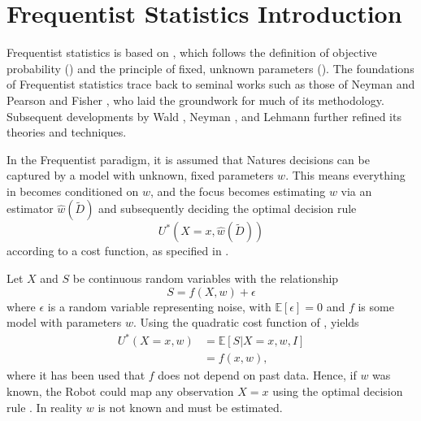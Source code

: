 \chapter{Frequentist Statistics Introduction}
\label{chp:freq}
Frequentist statistics is based on , which follows the definition of objective probability () and the principle of fixed, unknown parameters (). The foundations of Frequentist statistics trace back to seminal works such as those of Neyman and Pearson \citep{Neyman1928OnSR} and Fisher \citep{fisher1925statistical}, who laid the groundwork for much of its methodology. Subsequent developments by Wald \citep{Wald1945Sequential}, Neyman \citep{Neyman1948Consistent}, and Lehmann \citep{lehmann1986testing} further refined its theories and techniques.\newline

In the Frequentist paradigm, it is assumed that Natures decisions can be captured by a model with unknown, fixed parameters $w$. This means everything in  becomes conditioned on $w$, and the focus becomes estimating $w$ via an estimator $\hat{w}(\tilde{D})$ and subsequently deciding the optimal decision rule
\begin{equation}
	U^*(X=x, \hat{w}(\tilde{D}))
\end{equation}
according to a cost function, as specified in .


\begin{example}
	Let $X$ and $S$ be continuous random variables with the relationship~\cite{hastie2001}
	\begin{equation}
		S = f(X,w)+\epsilon
	\end{equation}
	where $\epsilon$ is a random variable representing noise, with $\mathbb{E}[\epsilon]=0$ and $f$ is some model with parameters $w$. Using the quadratic cost function of ,  yields
	\begin{equation}
		\label{eq:o1}
		\begin{split}
			U^*(X = x,w) &= \mathbb{E}[S|X=x,w,I]\\
			&= f(x,w),
		\end{split}
	\end{equation}
	where it has been used that $f$ does not depend on past data. Hence, if $w$ was known, the Robot could map any observation $X=x$ using the optimal decision rule . In reality $w$ is not known and must be estimated.
\end{example}


